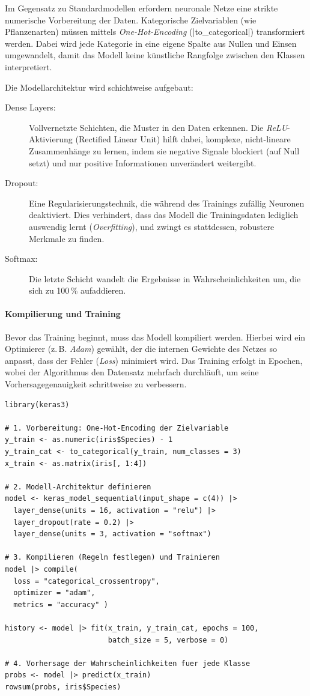 \documentclass[10pt,twocolumn]{scrartcl}
\renewcommand{\lstinline}{\mycoloredinline}
\begin{document}
Im Gegensatz zu Standardmodellen erfordern neuronale Netze eine strikte numerische Vorbereitung der Daten. Kategorische Zielvariablen (wie Pflanzenarten) müssen mittels \emph{One-Hot-Encoding} (\lstinline|to_categorical|) transformiert werden. Dabei wird jede Kategorie in eine eigene Spalte aus Nullen und Einsen umgewandelt, damit das Modell keine künstliche Rangfolge zwischen den Klassen interpretiert.

Die Modellarchitektur wird schichtweise aufgebaut:
\begin{description}
\item[Dense Layers:] Vollvernetzte Schichten, die Muster in den Daten erkennen. Die \emph{ReLU}-Aktivierung (Rectified Linear Unit) hilft dabei, komplexe, nicht-lineare Zusammenhänge zu lernen, indem sie negative Signale blockiert (auf Null setzt) und nur positive Informationen unverändert weitergibt.
\item[Dropout:] Eine Regularisierungstechnik, die während des Trainings zufällig Neuronen deaktiviert. Dies verhindert, dass das Modell die Trainingsdaten lediglich auswendig lernt (\emph{Overfitting}), und zwingt es stattdessen, robustere Merkmale zu finden.
\item[Softmax:] Die letzte Schicht wandelt die Ergebnisse in Wahrscheinlichkeiten um, die sich zu 100\,\% aufaddieren.
\end{description}

\paragraph{Kompilierung und Training}

Bevor das Training beginnt, muss das Modell kompiliert werden. Hierbei wird ein Optimierer (z.\,B. \emph{Adam}) gewählt, der die internen Gewichte des Netzes so anpasst, dass der Fehler (\emph{Loss}) minimiert wird. Das Training erfolgt in Epochen, wobei der Algorithmus den Datensatz mehrfach durchläuft, um seine Vorhersagegenauigkeit schrittweise zu verbessern.

\begin{lstlisting}
library(keras3)

# 1. Vorbereitung: One-Hot-Encoding der Zielvariable
y_train <- as.numeric(iris$Species) - 1 
y_train_cat <- to_categorical(y_train, num_classes = 3)
x_train <- as.matrix(iris[, 1:4])

# 2. Modell-Architektur definieren
model <- keras_model_sequential(input_shape = c(4)) |>
  layer_dense(units = 16, activation = "relu") |>
  layer_dropout(rate = 0.2) |>
  layer_dense(units = 3, activation = "softmax")

# 3. Kompilieren (Regeln festlegen) und Trainieren
model |> compile(
  loss = "categorical_crossentropy",
  optimizer = "adam", 
  metrics = "accuracy" )

history <- model |> fit(x_train, y_train_cat, epochs = 100,
                        batch_size = 5, verbose = 0)

# 4. Vorhersage der Wahrscheinlichkeiten fuer jede Klasse
probs <- model |> predict(x_train)
rowsum(probs, iris$Species)
\end{lstlisting}
\end{document}
